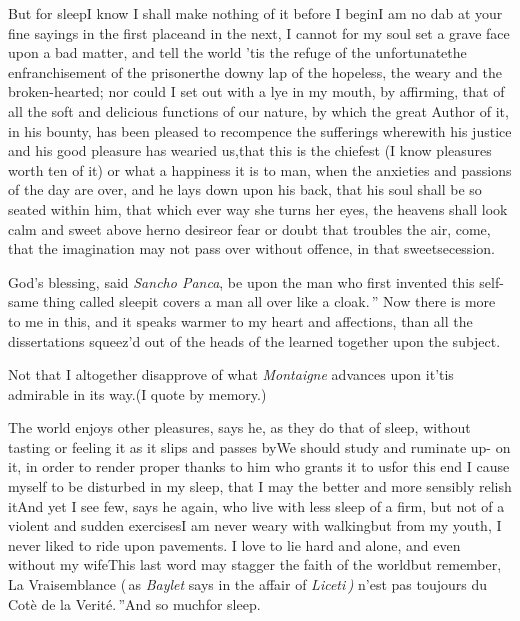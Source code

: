 \documentclass{article}
\begin{document}
But for sleep\tsk I know I shall make nothing of it before I begin\tsk I am no dab at
your fine sayings in the first place\break\tsk and in the
next, I cannot for my soul
set a grave face upon a bad matter, and tell the world\tsk
’tis the refuge of the unfortunate\tsk the enfranchisement
of the prisoner\tsk the downy lap of the hopeless, the
weary and the broken-hearted; nor could I set out with a
lye in my mouth, by affirming, that of all the soft and
delicious functions of our nature, by which the great Author
of it, in his bounty, has been pleased to recompence the
sufferings wherewith his justice and his good pleasure has
wearied us,\tsh that this is the chiefest (I know pleasures
worth ten of it) or what a happiness it is to man, when the
anxieties and passions of the day are over, and he lays down
upon his back, that his soul shall be so seated within him,
that which ever way she turns her eyes, the heavens shall
look calm and sweet above her\tsk no desire\tsk or fear\tsk
or doubt that troubles the air,
 come, that the imagination may not\break
pass over without offence, in that sweet\break secession.

\tsk\lqq God’s blessing, said \textit{Sancho Panca},\break
\lqq be upon the man who first invented\break
\lqq this self-same thing called sleep\tsk it\break
\lqq covers a man all over like a cloak.\,”\break
Now there is more to me in this, and it speaks warmer to my
heart and affections, than all the dissertations squeez’d out
of the heads of the learned together upon the subject.

\tsk Not that I altogether disapprove of what \textit{Montaigne} advances upon
it\tsk ’tis admirable in its way.\tsk (I quote by
memory.)

The world enjoys other pleasures, says
he, as they do that of sleep, without\break
tasting or feeling it as it slips and passes\break
by\tsk We should study and ruminate up-\break 
on it, in order to render proper thanks\break
to him who grants it to us\tsk for this end
I cause myself to be disturbed in my sleep, that I may the better and
more sensibly relish it\tsk And yet I see few, says he
again, who live with less sleep\break
{}\break
of a firm, but not of a violent and sudden
\break
exercises\tsk I am never weary with
walking\tsk but from my youth, I never liked to ride upon
pavements. I love to lie hard and alone, and even without my
wife\tsk This last word may stagger the faith of the
world\tsk but remember, \lqq La\break
\lqq Vraisemblance (\,as \textit{Baylet} says in the\break
\lqq affair of \textit{Liceti\,)\sic} n’est pas toujours
\lqq du Cotè de la Verité.\,”\quad And so much\break for sleep.
\end{document}
